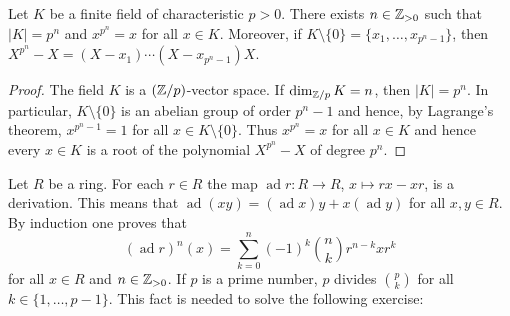 


\begin{lemma}
	\label{lem:k_finito}
	Let $K$ be a finite field of characteristic $p>0$. There exists 
	$n\in\mathbb{Z}_{>0}$ such that $|K|=p^n$ and $x^{p^n}=x$ for all $x\in K$. Moreover, 
	if $K\setminus\{0\}=\{x_1,\dots,x_{p^n-1}\}$, then 
	$X^{p^n}-X=(X-x_1)\cdots(X-x_{p^n-1})X$. 
\end{lemma}

\begin{proof}
	The field $K$ is a $(\mathbb{Z}/p)$-vector space. If $\dim_{\mathbb{Z}/p} K=n$, then 
	$|K|=p^n$. In particular, $K\setminus\{0\}$ is an abelian
	group of order $p^{n}-1$ and hence, by Lagrange's theorem, 
	$x^{p^n-1}=1$ for all $x\in K\setminus\{0\}$. Thus $x^{p^n}=x$ for all $x\in K$
	and hence every $x\in K$ is a root of the polynomial 
	$X^{p^n}-X$ of degree $p^n$. 
\end{proof}

Let $R$ be a ring. For each $r\in R$ the map $\operatorname{ad}{r}\colon
R\to R$, $x\mapsto rx-xr$, is a derivation. This means that
$\operatorname{ad}(xy)=(\operatorname{ad} x)y+x(\operatorname{ad} y)$ for all $x,y\in R$. 
By induction one proves that 
\begin{equation}
	\label{eq:Leibniz}
	(\operatorname{ad}{r})^n(x)=\sum_{k=0}^n(-1)^k\binom{n}{k}r^{n-k}xr^k
\end{equation}
for all $x\in R$ and $n\in\mathbb{Z}_{>0}$. If $p$ 
is a prime number, 
$p$ divides $\binom{p}{k}$ for all $k\in\{1,\dots,p-1\}$. This fact
is needed to solve the following exercise:

